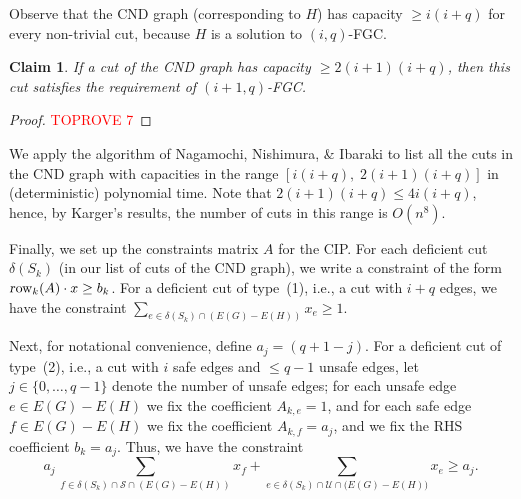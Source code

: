 \documentclass[11pt]{article}
\newtheorem{claim}[theorem]{Claim}
\newcommand{\safe}{\mathscr{S}}
\newcommand{\unsafe}{\mathscr{U}}
\newcommand{\row}{\hbox{\textsl row}}
\begin{document}
\begin{appendices}
{Observe that the CND graph (corresponding to $H$) has capacity $\ge i(i+q)$ for
every non-trivial cut, because $H$ is a solution to $(i,q)$-FGC.

\begin{claim}
If a cut of the CND graph has capacity $\geq 2(i+1)(i+q)$,
then this cut satisfies the requirement of $(i+1,q)$-FGC.
\end{claim}
\begin{proof}\textcolor{red}{TOPROVE 7}\end{proof}

We apply the algorithm of Nagamochi, Nishimura, \& Ibaraki \cite{NNI97}
to list all the cuts in the CND graph
with capacities in the range $[i(i+q),\;2(i+1)(i+q)]$
in (deterministic) polynomial time.
Note that $2(i+1)(i+q) \leq 4 i(i+q)$, hence, by Karger's results,
the number of cuts in this range is $O(n^8)$.

Finally, we set up the constraints matrix $A$ for the CIP.
For each deficient cut $\delta(S_k)$ (in our list of cuts of the CND graph),
we write a constraint of the form $\row_k(A) \cdot x \geq b_k$.
For a deficient cut of type~(1), i.e., a cut with $i+q$ edges,
we have the constraint $\sum_{e\in\delta(S_k)\cap{(E(G)-E(H))}}x_e\geq1$.

Next, for notational convenience, define $a_j = (q+1-j)$.
For a deficient cut of type~(2), i.e., a cut with $i$ safe edges and $\leq q-1$ unsafe edges,
let $j\in\{0,\dots,q-1\}$ denote the number of unsafe edges;
for each unsafe edge $e\in E(G)-E(H)$ we fix the coefficient $A_{k,e} = 1$, and
for each safe edge $f\in E(G)-E(H)$ we fix the coefficient $A_{k,f} = a_j$,
and we fix the RHS coefficient $b_k = a_j$.
Thus, we have the constraint
\[	a_j \, \sum_{f\in\delta(S_k)\cap\safe\cap{(E(G)-E(H))}}x_f +
        \sum_{e\in\delta(S_k)\cap\unsafe\cap{(E(G)-E(H)})}x_e \geq{a_j}.
\]
}


\end{appendices}


\end{document}
